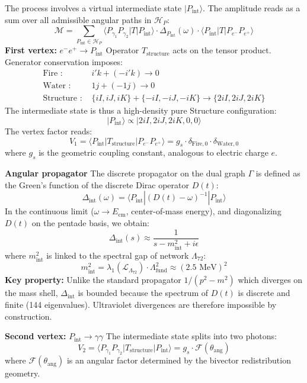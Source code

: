 \documentclass[11pt]{article}
\let\oldmathcal\mathcal
\renewcommand{\mathcal}[1]{\oldmathcal{#1}}
\begin{document}
The process involves a virtual intermediate state
\(|P_{\text{int}}\rangle\). The amplitude reads as a sum over all
admissible angular paths in \(\mathcal{H}_P\): \[
\mathcal{M} = \sum_{P_{\text{int}} \in \mathcal{H}_P} \langle P_{\gamma_1} P_{\gamma_2} | T | P_{\text{int}} \rangle \cdot \Delta_{P_{\text{int}}}(\omega) \cdot \langle P_{\text{int}} | T | P_{e^-} P_{e^+} \rangle
\] \textbf{First vertex:} \(e^- e^+ \to P_{\text{int}}\) Operator
\(T_{\text{structure}}\) acts on the tensor product. Generator
conservation imposes: \[
\begin{aligned}
\text{Fire : } & i'k + (-i'k) \to 0 \\
\text{Water : } & 1j + (-1j) \to 0 \\
\text{Structure : } & \{iI, iJ, iK\} + \{-iI, -iJ, -iK\} \to \{2iI, 2iJ, 2iK\}
\end{aligned}
\] The intermediate state is thus a high-density pure Structure
configuration: \[
|P_{\text{int}}\rangle \propto \big| { 2iI, 2iJ, 2iK, 0, 0 } \big\rangle
\] The vertex factor reads: \[
V_1 = \langle P_{\text{int}} | T_{\text{structure}} | P_{e^-} P_{e^+} \rangle = g_s \cdot \delta_{\text{Fire},0} \cdot \delta_{\text{Water},0}
\] where \(g_s\) is the geometric coupling constant, analogous to
electric charge \(e\).

\textbf{Angular propagator} The discrete propagator on the dual graph
\(\Gamma\) is defined as the Green's function of the discrete Dirac
operator \(D(t)\): \[
\Delta_{\text{int}}(\omega) = \langle P_{\text{int}} | \left( D(t) - \omega \right)^{-1} | P_{\text{int}} \rangle
\] In the continuous limit (\(\omega \to E_{\text{cm}}\), center-of-mass
energy), and diagonalizing \(D(t)\) on the pentade basis, we obtain: \[
\Delta_{\text{int}}(s) \approx \frac{1}{s - m_{\text{int}}^2 + i\epsilon}
\] where \(m_{\text{int}}^2\) is linked to the spectral gap of network
\(\Lambda_{72}\): \[
m_{\text{int}}^2 = \lambda_1(\mathcal{L}_{\Lambda_{72}}) \cdot \Lambda_{\text{fund}}^2 \approx (2.5 \text{ MeV})^2
\] \textbf{Key property:} Unlike the standard propagator \(1/(p^2-m^2)\)
which diverges on the mass shell, \(\Delta_{\text{int}}\) is bounded
because the spectrum of \(D(t)\) is discrete and finite (144
eigenvalues). Ultraviolet divergences are therefore impossible by
construction.

\textbf{Second vertex:} \(P_{\text{int}} \to \gamma\gamma\) The
intermediate state splits into two photons: \[
V_2 = \langle P_{\gamma_1} P_{\gamma_2} | T_{\text{structure}} | P_{\text{int}} \rangle = g_s \cdot \mathcal{F}(\theta_{\text{ang}})
\] where \(\mathcal{F}(\theta_{\text{ang}})\) is an angular factor
determined by the bivector redistribution geometry.
\end{document}
